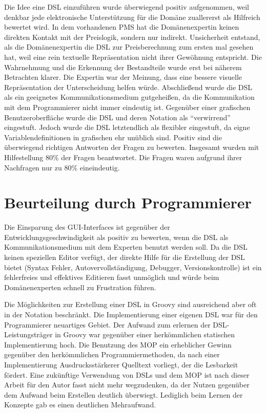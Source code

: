 \documentclass[11pt,english,ngerman, headsepline]{scrreprt}
\begin{document}
Die Idee eine DSL einzuführen wurde überwiegend positiv aufgenommen, weil
denkbar jede elektronische Unterstützung für die Domäne zuallererst als
Hilfreich bewertet wird.
In dem vorhandenen PMS hat die Domänenexpertin keinen direkten Kontakt mit der
Preislogik, sondern nur indirekt.
Unsicherheit entstand, als die Domänenexpertin die DSL zur Preisberechnung
 zum ersten mal gesehen hat, weil eine
rein textuelle Repräsentation nicht ihrer Gewöhnung entspricht. Die Wahrnehmung
und die Erkennung der Bestandteile wurde erst bei näherem Betrachten klarer. 
Die Expertin war der Meinung, dass eine bessere visuelle Repräsentation der
Unterscheidung helfen würde. Abschließend wurde die DSL als ein geeignetes
Kommunikationsmedium gutgeheißen, da die Kommunikation mit dem Programmierer nicht immer eindeutig ist.
Gegenüber einer grafischen Benutzeroberfläche wurde die DSL und deren Notation
als ``verwirrend'' eingestuft. Jedoch wurde die DSL letztendlich als flexibler
eingestuft, da eigne Variablendefinitionen in grafischen ehr unüblich sind.
Positiv sind die überwiegend richtigen Antworten der Fragen zu bewerten.
Insgesamt wurden mit Hilfestellung 80\% der Fragen beantwortet. Die Fragen waren
aufgrund ihrer Nachfragen nur zu 80\% eineindeutig.



\section{Beurteilung durch Programmierer}\label{reaktionProgrammierer}
 
Die Einsparung des GUI-Interfaces ist gegenüber der Entwicklungsgeschwindigkeit
als positiv zu bewerten, wenn die DSL als Kommunikationsmedium mit dem Experten
benutzt werden soll. 
Da die DSL keinen speziellen Editor verfügt, der direkte Hilfe für die
Erstellung der DSL bietet (Syntax Fehler, Autovervollständigung, Debugger,
Versionskontrolle) ist ein fehlerfreies und effektives Editieren fasst unmöglich
und würde beim Domänenexperten schnell zu Frustration führen. 

Die Möglichkeiten zur Erstellung einer DSL in Groovy sind ausreichend aber oft
in der Notation beschränkt. 
Die Implementierung einer eigenen DSL war für den Programmierer neuartiges
Gebiet. Der Aufwand zum erlernen der DSL-Leistungsträger in Groovy war gegenüber
einer herkömmlichen statischen Implementierung hoch. Die Benutzung des MOP ein
erheblicher Gewinn gegenüber den herkömmlichen Programmiermethoden, da nach
einer Implementierung Ausdrucksstärkerer Quelltext vorliegt, der die Lesbarkeit
fördert.
Eine zukünftige Verwendung von DSLs und dem MOP ist nach dieser Arbeit für den
Autor fasst nicht mehr wegzudenken, da der Nutzen gegenüber dem Aufwand beim 
Erstellen deutlich überwiegt. Lediglich beim Lernen der Konzepte gab es
einen deutlichen Mehraufwand.
 
\end{document}
